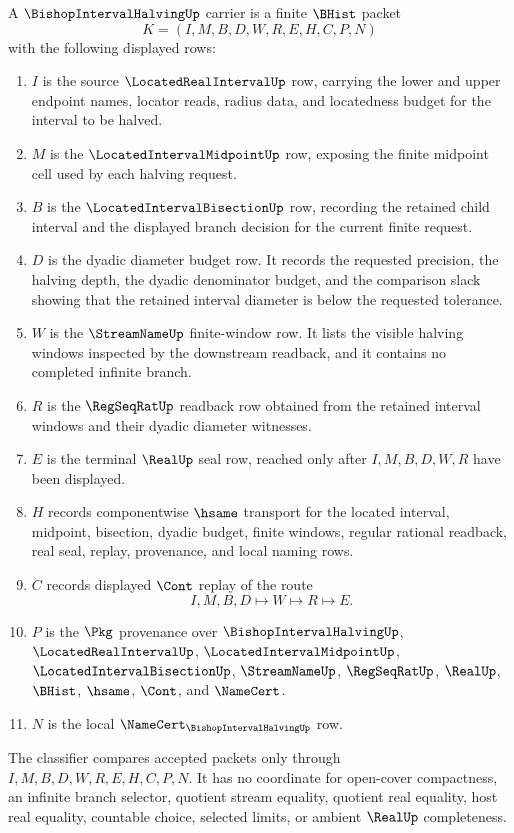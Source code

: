 \begin{definition}
\label{def:bishop-interval-halving-carrier}
A $\BishopIntervalHalvingUp$ carrier is a finite $\BHist$ packet
$$
K=(I,M,B,D,W,R,E,H,C,P,N)
$$
with the following displayed rows:
\begin{enumerate}
\item $I$ is the source $\LocatedRealIntervalUp$ row, carrying the lower and upper endpoint names, locator reads, radius data, and locatedness budget for the interval to be halved.
\item $M$ is the $\LocatedIntervalMidpointUp$ row, exposing the finite midpoint cell used by each halving request.
\item $B$ is the $\LocatedIntervalBisectionUp$ row, recording the retained child interval and the displayed branch decision for the current finite request.
\item $D$ is the dyadic diameter budget row. It records the requested precision, the halving depth, the dyadic denominator budget, and the comparison slack showing that the retained interval diameter is below the requested tolerance.
\item $W$ is the $\StreamNameUp$ finite-window row. It lists the visible halving windows inspected by the downstream readback, and it contains no completed infinite branch.
\item $R$ is the $\RegSeqRatUp$ readback row obtained from the retained interval windows and their dyadic diameter witnesses.
\item $E$ is the terminal $\RealUp$ seal row, reached only after $I,M,B,D,W,R$ have been displayed.
\item $H$ records componentwise $\hsame$ transport for the located interval, midpoint, bisection, dyadic budget, finite windows, regular rational readback, real seal, replay, provenance, and local naming rows.
\item $C$ records displayed $\Cont$ replay of the route
$$
I,M,B,D \longmapsto W \longmapsto R \longmapsto E .
$$
\item $P$ is the $\Pkg$ provenance over $\BishopIntervalHalvingUp$, $\LocatedRealIntervalUp$, $\LocatedIntervalMidpointUp$, $\LocatedIntervalBisectionUp$, $\StreamNameUp$, $\RegSeqRatUp$, $\RealUp$, $\BHist$, $\hsame$, $\Cont$, and $\NameCert$.
\item $N$ is the local $\NameCert_{\BishopIntervalHalvingUp}$ row.
\end{enumerate}
The classifier compares accepted packets only through $I,M,B,D,W,R,E,H,C,P,N$. It has no coordinate for open-cover compactness, an infinite branch selector, quotient stream equality, quotient real equality, host real equality, countable choice, selected limits, or ambient $\RealUp$ completeness.
\end{definition}

